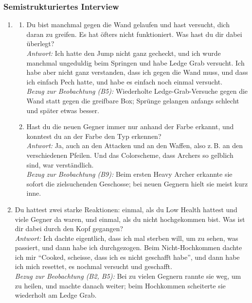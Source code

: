 \documentclass[../Main.tex]{subfiles}
\begin{document}
\subsubsection{Semistrukturiertes Interview}

\begin{enumerate}[label=\textbf{I\arabic*}, leftmargin=1.5cm, itemsep=1em]
\item
\begin{enumerate}[label=\alph*), itemsep=0.6em]
    \item Du bist manchmal gegen die Wand gelaufen und hast versucht, dich daran zu greifen. Es hat öfters nicht funktioniert. Was hast du dir dabei überlegt? \\
        \textit{Antwort:} Ich hatte den Jump nicht ganz gecheckt, und ich wurde manchmal ungeduldig beim Springen und habe Ledge Grab versucht. Ich habe aber nicht ganz verstanden, dass ich gegen die Wand muss, und dass ich einfach Pech hatte, und habe es einfach noch einmal versucht. \\
        \textit{Bezug zur Beobachtung (B5):} Wiederholte Ledge-Grab-Versuche gegen die Wand statt gegen die greifbare Box; Sprünge gelangen anfangs schlecht und später etwas besser.
    \item Hast du die neuen Gegner immer nur anhand der Farbe erkannt, und konntest du an der Farbe den Typ erkennen? \\
        \textit{Antwort:} Ja, auch an den Attacken und an den Waffen, also z.\,B. an den verschiedenen Pfeilen. Und das Colorscheme, dass Archers so gelblich sind, war verständlich. \\
        \textit{Bezug zur Beobachtung (B9):} Beim ersten Heavy Archer erkannte sie sofort die zielsuchenden Geschosse; bei neuen Gegnern hielt sie meist kurz inne.
\end{enumerate}

\item Du hattest zwei starke Reaktionen: einmal, als du Low Health hattest und viele Gegner da waren, und einmal, als du nicht hochgekommen bist. Was ist dir dabei durch den Kopf gegangen? \\
\textit{Antwort:} Ich dachte eigentlich, dass ich mal sterben will, um zu sehen, was passiert, und dann habe ich durchgezogen. Beim Nicht-Hochkommen dachte ich mir \enquote{Cooked, scheisse, dass ich es nicht geschafft habe}, und dann habe ich mich resettet, es nochmal versucht und geschafft. \\
\textit{Bezug zur Beobachtung (B2, B5):} Bei zu vielen Gegnern rannte sie weg, um zu heilen, und machte danach weiter; beim Hochkommen scheiterte sie wiederholt am Ledge Grab.


\end{enumerate}
\end{document}
